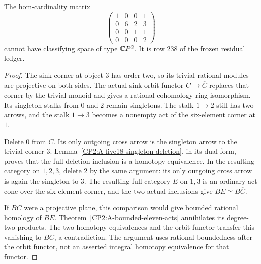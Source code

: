\begin{proposition}
\label{CP2:A-four17-final-triangle}
The hom-cardinality matrix
\[
\begin{pmatrix}
1&0&0&1\\
0&6&2&3\\
0&0&1&1\\
0&0&0&2
\end{pmatrix}
\]
cannot have classifying space of type $\mathbb{C}P^2$.
It is row $238$ of the frozen residual ledger.
\end{proposition}
\begin{proof}
The sink corner at object $3$ has order two, so its
trivial rational modules are projective on both sides.
The actual sink-orbit functor $C\to\overline C$ replaces
that corner by the trivial monoid and gives a rational
cohomology-ring isomorphism. Its singleton stalks from
$0$ and $2$ remain singletons. The stalk $1\to2$ still
has two arrows, and the stalk $1\to3$ becomes a nonempty
act of the six-element corner at $1$.

Delete $0$ from $\overline C$. Its only outgoing cross
arrow is the singleton arrow to the trivial corner $3$.
Lemma~\ref{CP2:A-five18-singleton-deletion}, in its dual
form, proves that the full deletion inclusion is a
homotopy equivalence. In the resulting category on
$1,2,3$, delete $2$ by the same argument: its only
outgoing cross arrow is again the singleton to $3$.
The resulting full category $E$ on $1,3$ is an ordinary
act cone over the six-element corner, and the two actual
inclusions give $BE\simeq B\overline C$.

If $BC$ were a projective plane, this comparison would
give bounded rational homology of $BE$.
Theorem~\ref{CP2:A-bounded-eleven-acts} annihilates its
degree-two products. The two homotopy equivalences and
the orbit functor transfer this vanishing to $BC$, a
contradiction. The argument uses rational boundedness
after the orbit functor, not an asserted integral
homotopy equivalence for that functor.
\end{proof}
